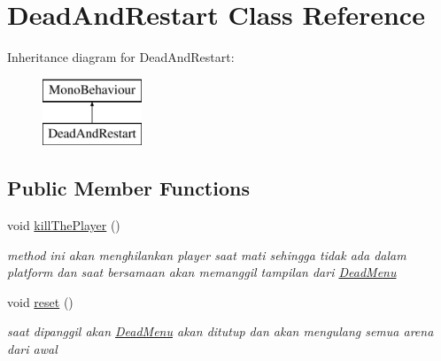 \hypertarget{class_dead_and_restart}{}\section{Dead\+And\+Restart Class Reference}
\label{class_dead_and_restart}
Inheritance diagram for Dead\+And\+Restart\+:\begin{figure}[H]
\begin{center}
\leavevmode
\includegraphics[height=2.000000cm]{class_dead_and_restart}
\end{center}
\end{figure}
\subsection*{Public Member Functions}
\begin{DoxyCompactItemize}
\item 
void \hyperlink{class_dead_and_restart_a051bee469f462b949f4ce83791c2294f}{kill\+The\+Player} ()
\begin{DoxyCompactList}\small\item\em method ini akan menghilankan player saat mati sehingga tidak ada dalam platform dan saat bersamaan akan memanggil tampilan dari \hyperlink{class_dead_menu}{Dead\+Menu} \end{DoxyCompactList}\item 
void \hyperlink{class_dead_and_restart_a38d762c09b1bcaa35a0a2cb0807c38f3}{reset} ()
\begin{DoxyCompactList}\small\item\em saat dipanggil akan \hyperlink{class_dead_menu}{Dead\+Menu} akan ditutup dan akan mengulang semua arena dari awal \end{DoxyCompactList}\end{DoxyCompactItemize}
